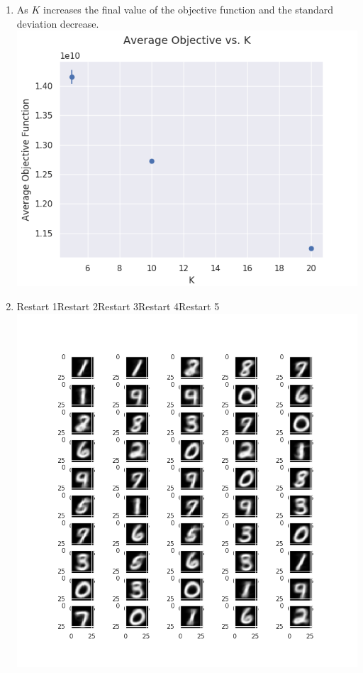 \documentclass[submit]{harvardml}
\begin{document}
\begin{enumerate}
    \item As $K$ increases the final value of the objective function and the standard deviation decrease. \newline
    \includegraphics[scale=.70]{hw4/Pics/Part2.png}
    \newpage
    \item\hspace{2 cm}Restart 1\hspace{1 cm}Restart 2\hspace{1 cm}Restart 3\hspace{1 cm}Restart 4\hspace{1 cm}Restart 5 \newline
    \includegraphics[scale=.70]{hw4/Pics/Part3.png}\newline

\end{enumerate}
\end{document}
